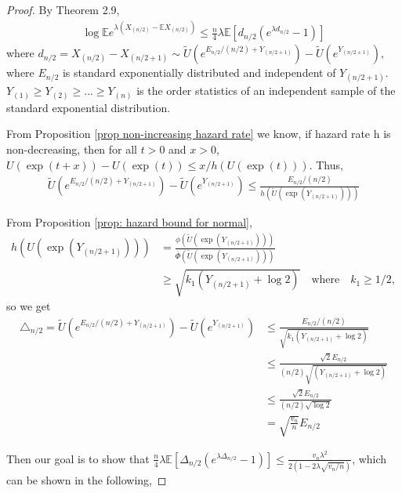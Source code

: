 \documentclass{article}
\theoremstyle{plain}
\begin{document}
\begin{proof}
By \cite{boucheron2012} Theorem 2.9, 
\begin{align}
    \log \mathbb{E} e^{\lambda\left(X_{(n / 2)}-\mathbb{E} X_{(n / 2)}\right)} \leq \frac{n}{4} \lambda \mathbb{E}\left[d_{n / 2}\left(e^{\lambda d_{n / 2}}-1\right)\right]
\end{align}
where $d_{n / 2}=X_{(n / 2)}-X_{(n / 2+1)} \sim \tilde{U}\left(e^{E_{n / 2} /(n / 2)+Y_{(n / 2+1)}} \right)- \tilde{U}\left(e^{Y_{(n / 2+1)}}\right),$ where $E_{n/2}$ is standard exponentially distributed and independent of $Y_{(n/2 + 1)}$. $Y_{(1)} \geq Y_{(2)} \geq ... \geq Y_{(n)}$ is the order statistics of an independent sample of the standard exponential distribution. 

From Proposition \ref{prop non-increasing hazard rate} we know, if hazard rate h is non-decreasing, then for all $t > 0$ and $x > 0$, $U(\exp (t+x))-U(\exp (t)) \leq x / h(U(\exp (t)))$. Thus, 
\begin{align}
    \tilde{U}\left(e^{E_{n / 2} /(n / 2)+Y_{(n / 2+1)}} \right)- \tilde{U}\left(e^{Y_{(n / 2+1)}}\right) \leq \frac{E_{n / 2} /(n / 2)}{h(\tilde{U}(\exp{(Y_{(n/2+1)})}))}
\end{align}

From Proposition \ref{prop: hazard bound for normal}, 
\begin{align}
    h(U(\exp{(Y_{(n/2+1)})})) &= \frac{\phi(\widetilde{U}(\exp (Y_{(n/2+1)})))}{\overline{\Phi}(\widetilde{U}(\exp (Y_{(n/2+1)})))}\\
    &\geq \sqrt{k_1 (Y_{(n/2+1)} + \log 2)} \quad \text{where} \quad k_1 \geq 1/2,
\end{align}
so we get 
\begin{align}
    \triangle_{n/2} = \tilde{U}\left(e^{E_{n / 2} /(n / 2)+Y_{(n / 2+1)}} \right)-\tilde{U}\left(e^{Y_{(n / 2+1)}}\right) 
    &\leq \frac{E_{n / 2} /(n / 2)}{\sqrt{k_1 (Y_{(n/2+1)} + \log 2)}}\\
    &\leq \frac{ \sqrt{2} E_{n / 2} }{(n / 2)\sqrt{(Y_{(n/2+1)} + \log 2)}}\\
    &\leq \frac{ \sqrt{2} E_{n / 2} }{(n / 2)\sqrt{ \log 2}}\\
    &= \sqrt{\frac{v_{n}}{n}} E_{n / 2}
\end{align}

Then our goal is to show that $\frac{n}{4} \lambda \mathbb{E}\left[\Delta_{n / 2}\left(e^{\lambda \Delta_{n / 2}}-1\right)\right] \leq \frac{v_{n} \lambda^{2}}{2\left(1-2 \lambda \sqrt{v_{n} / n}\right)}$, which can be shown in the following,


\end{proof}
\end{document}
